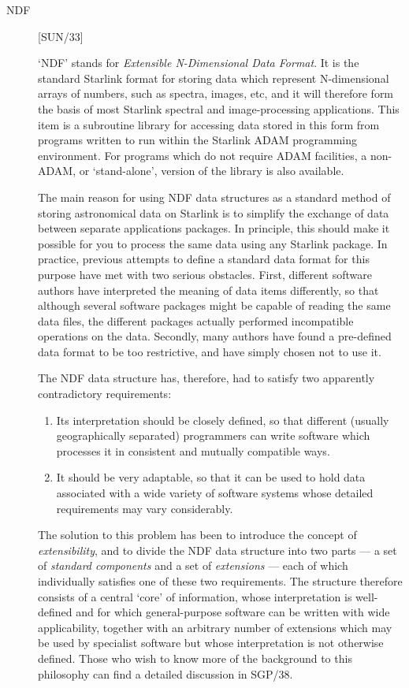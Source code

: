 \begin{description}

\item [NDF] \hfill [SUN/33]

`NDF' stands for {\em Extensible N-Dimensional Data Format}. 
It is the standard Starlink format for storing data which represent
N-dimensional arrays of numbers, such as spectra, images, etc, and it
will therefore form the basis of most Starlink spectral and image-processing
applications. 
This item is a subroutine library for accessing data stored in this form from
programs written to run within the Starlink ADAM programming environment.
For programs which do not require ADAM facilities, a non-ADAM, or
`stand-alone', version of the library is also available.

The main reason for using NDF data structures as a standard method of
storing astronomical data on Starlink is to simplify the exchange of data
between separate applications packages. 
In principle, this should make it possible for you to process the same data
using any Starlink package. 
In practice, previous attempts to define a standard data format for this
purpose have met with two serious obstacles. 
First, different software authors have interpreted the meaning of data
items differently, so that although several software packages might be
capable of reading the same data files, the different packages actually
performed incompatible operations on the data. 
Secondly, many authors have found a pre-defined data format to be
too restrictive, and have simply chosen not to use it. 

The NDF data structure has, therefore, had to satisfy two apparently
contradictory requirements: 

\begin{enumerate}

\item Its interpretation should be closely defined, so that different
(usually geographically separated) programmers can write software which
processes it in consistent and mutually compatible ways. 

\item It should be very adaptable, so that it can be used to hold data
associated with a wide variety of software systems whose detailed
requirements may vary considerably. 

\end{enumerate}

The solution to this problem has been to introduce the concept of {\em
extensibility}, and to divide the NDF data structure into two parts --- a set
of {\em standard components\/} and a set of {\em extensions\/} --- each of which
individually satisfies one of these two requirements. 
The structure therefore consists of a central `core' of information, whose
interpretation is well-defined and for which general-purpose software can be
written with wide applicability, together with an arbitrary number of extensions
which may be used by specialist software but whose interpretation is not
otherwise defined. 
Those who wish to know more of the background to this philosophy can find a 
detailed discussion in SGP/38.


\end{description}
